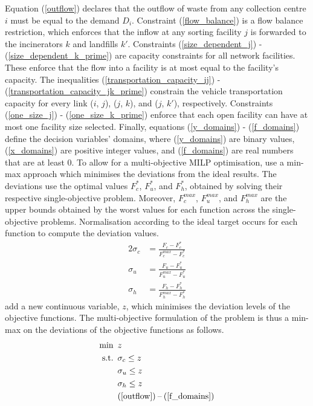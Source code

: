 \documentclass[mscthesis, 11pt]{usiinfthesis}
\theoremstyle{newdefinition}
\begin{document}
Equation (\ref{outflow}) declares that the outflow of waste from any collection centre $i$ must be equal to the demand $D_i$. Constraint (\ref{flow_balance}) is a flow balance restriction, which enforces that the inflow at any sorting facility $j$ is forwarded to the incinerators $k$ and landfills $k'$. Constraints (\ref{size_dependent_j}) - (\ref{size_dependent_k_prime}) are capacity constraints for all network facilities. These enforce that the flow into a facility is at most equal to the facility's capacity. The inequalities (\ref{transportation_capacity_ij}) - (\ref{transportation_capacity_jk_prime}) constrain the vehicle transportation capacity for every link ($i$, $j$), ($j$, $k$), and ($j$, $k'$), respectively. Constraints (\ref{one_size_j}) - (\ref{one_size_k_prime}) enforce that each open facility can have at most one facility size selected. Finally, equations (\ref{y_domains}) - (\ref{f_domains}) define the decision variables' domains, where (\ref{y_domains}) are binary values, (\ref{x_domains}) are positive integer values, and (\ref{f_domains}) are real numbers that are at least 0.
\newline \newline 
To allow for a multi-objective MILP optimisation, \cite[pp.~5 --- 6]{olapiriyakul_multiobjective_2019}  use a min-max approach which minimises the deviations from the ideal results.
The deviations use the optimal values $F^{*}_{c}$, $F^{*}_{u}$, and $F^{*}_{h}$, obtained by solving their respective single-objective problem. Moreover, $F^{max}_{c}$, $F^{max}_{u}$, and $F^{max}_{h}$ are the upper bounds obtained by the worst values for each function across the single-objective problems. Normalisation according to the ideal target occurs for each function to compute the deviation values.
\begin{alignat}{2}
    \sigma_c & = \frac{F_c - F^*_c}{F^{max}_c - F^*_c} \label{deviation_cost}\\
    \sigma_u & = \frac{F_u - F^*_u}{F^{max}_u - F^*_u} \label{deviation_land} \\
    \sigma_h & = \frac{F_h - F^*_h}{F^{max}_h - F^*_h} \label{deviation_health}
\end{alignat}
\cite{olapiriyakul_multiobjective_2019} add a new continuous variable, $z$, which minimises the deviation levels of the objective functions. The multi-objective formulation of the problem is thus a min-max on the deviations of the objective functions as follows.
\begin{alignat}{2}
    \text{min} \enspace & z \\
    \text{s.t.} \enspace & \sigma_c \leq z \\
    & \sigma_u \leq z \\
    & \sigma_h \leq z \\
    & (\ref{outflow}) \: \text{--} \: (\ref{f_domains})
\end{alignat}
\clearpage
\end{document}
